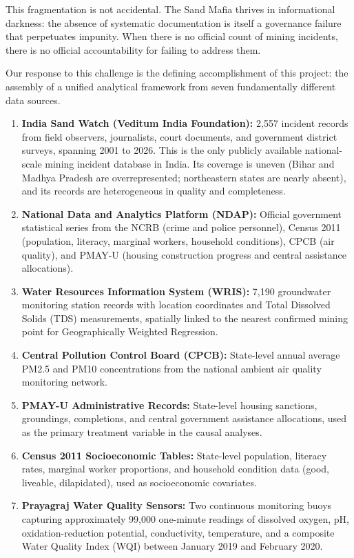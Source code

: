 \documentclass[12pt]{article}
\begin{document}
This fragmentation is not accidental. The Sand Mafia thrives in informational darkness: the absence of systematic documentation is itself a governance failure that perpetuates impunity. When there is no official count of mining incidents, there is no official accountability for failing to address them.

Our response to this challenge is the defining accomplishment of this project: the assembly of a unified analytical framework from seven fundamentally different data sources.

\begin{enumerate}
    \item \textbf{India Sand Watch (Veditum India Foundation):} 2,557 incident records from field observers, journalists, court documents, and government district surveys, spanning 2001 to 2026. This is the only publicly available national-scale mining incident database in India. Its coverage is uneven (Bihar and Madhya Pradesh are overrepresented; northeastern states are nearly absent), and its records are heterogeneous in quality and completeness.
    \item \textbf{National Data and Analytics Platform (NDAP):} Official government statistical series from the NCRB (crime and police personnel), Census 2011 (population, literacy, marginal workers, household conditions), CPCB (air quality), and PMAY-U (housing construction progress and central assistance allocations).
    \item \textbf{Water Resources Information System (WRIS):} 7,190 groundwater monitoring station records with location coordinates and Total Dissolved Solids (TDS) measurements, spatially linked to the nearest confirmed mining point for Geographically Weighted Regression.
    \item \textbf{Central Pollution Control Board (CPCB):} State-level annual average PM2.5 and PM10 concentrations from the national ambient air quality monitoring network.
    \item \textbf{PMAY-U Administrative Records:} State-level housing sanctions, groundings, completions, and central government assistance allocations, used as the primary treatment variable in the causal analyses.
    \item \textbf{Census 2011 Socioeconomic Tables:} State-level population, literacy rates, marginal worker proportions, and household condition data (good, liveable, dilapidated), used as socioeconomic covariates.
    \item \textbf{Prayagraj Water Quality Sensors:} Two continuous monitoring buoys capturing approximately 99,000 one-minute readings of dissolved oxygen, pH, oxidation-reduction potential, conductivity, temperature, and a composite Water Quality Index (WQI) between January 2019 and February 2020.
\end{enumerate}
\end{document}
